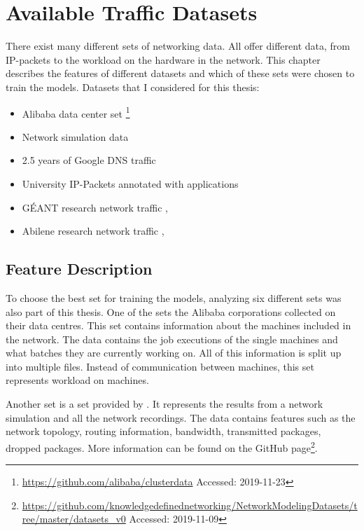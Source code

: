 \section{Available Traffic Datasets}
There exist many different sets of networking data.
All offer different data, from IP-packets to the workload on the hardware in the network.
This chapter describes the features of different datasets and which of these sets were chosen to train the models.
Datasets that I considered for this thesis:
\begin{itemize}
	\item Alibaba data center set \footnote{\url{https://github.com/alibaba/clusterdata} Accessed: 2019-11-23}
	\item Network simulation data \cite{Mestres:2017:KN:3138808.3138810}
	\item 2.5 years of Google DNS traffic \cite{8506536}
	\item University IP-Packets annotated with applications \cite{10.1007/978-3-319-95168-3_37}
	\item GÉANT research network traffic \cite{SNDlib10}, \cite{OrlowskiPioroTomaszewskiWessaely2010}
	\item Abilene research network traffic \cite{SNDlib10}, \cite{OrlowskiPioroTomaszewskiWessaely2010}
\end{itemize}
\subsection{Feature Description}
To choose the best set for training the models, analyzing six different sets was also part of this thesis.
One of the sets the Alibaba corporations collected on their data centres.
This set contains information about the machines included in the network.
The data contains the job executions of the single machines and what batches they are currently working on.
All of this information is split up into multiple files.
Instead of communication between machines, this set represents workload on machines.

Another set is a set provided by \cite{Mestres:2017:KN:3138808.3138810}.
It represents the results from a network simulation and all the network recordings.
The data contains features such as the network topology, routing information, bandwidth, transmitted packages, dropped packages.
More information can be found on the GitHub page\footnote{\url{https://github.com/knowledgedefinednetworking/NetworkModelingDatasets/tree/master/datasets\_v0}  Accessed: 2019-11-09}.


